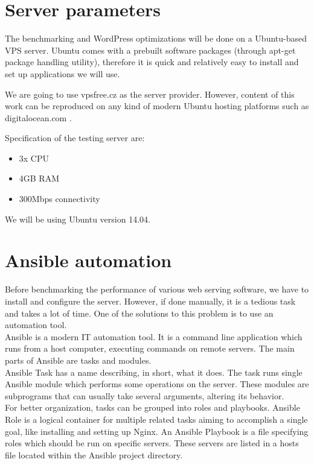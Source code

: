 \section{Server parameters}

The benchmarking and WordPress optimizations will be done on a Ubuntu-based VPS server. Ubuntu comes with a prebuilt software packages (through apt-get package handling utility), therefore it is quick and relatively easy to install and set up applications we will use.

We are going to use vpsfree.cz \cite{Hosting:vpsfree.cz} as the server provider. However, content of this work can be reproduced on any kind of modern Ubuntu hosting platforms such as digitalocean.com \cite{Hosting:do.com}.

Specification of the testing server are:
\begin{itemize}
	\item 3x CPU
	\item 4GB RAM
	\item 300Mbps connectivity
\end{itemize}

We will be using Ubuntu version 14.04.

\section{Ansible automation}

Before benchmarking the performance of various web serving software, we have to install and configure the server. However, if done manually, it is a tedious task and takes a lot of time. One of the solutions to this problem is to use an automation tool. \\

Ansible is a modern IT automation tool. It is a command line application which runs from a host computer, executing commands on remote servers. The main parts of Ansible are tasks and modules. \\

Ansible Task has a name describing, in short, what it does. The task runs single Ansible module which performs some operations on the server. These modules are subprograms that can usually take several arguments, altering its behavior. \\

For better organization, tasks can be grouped into roles and playbooks. Ansible Role is a logical container for multiple related tasks aiming to accomplish a single goal, like installing and setting up Nginx. An Ansible Playbook is a file specifying roles which should be run on specific servers. These servers are listed in a hosts file located within the Ansible project directory. \\

